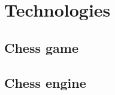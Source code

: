 \chapter{Technologies}
\label{chap:ch5}


\section{Chess game}
\label{sec:ch5sec1}


\section{Chess engine}
\label{sec:ch5sec2}

